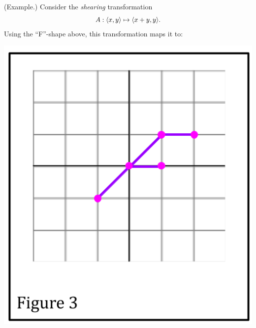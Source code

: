 \documentclass[letterpaper]{article}
\begin{document}
\begin{mdframed}[]
    (Example.) Consider the \emph{shearing} transformation
    \[A: \langle x, y \rangle \mapsto \langle x + y, y \rangle.\]
    Using the ``F''-shape above, this transformation maps it to: 
    \begin{center}
        \includegraphics[scale=0.3]{../assets/f2.png}
    \end{center}
\end{mdframed}
\end{document}
